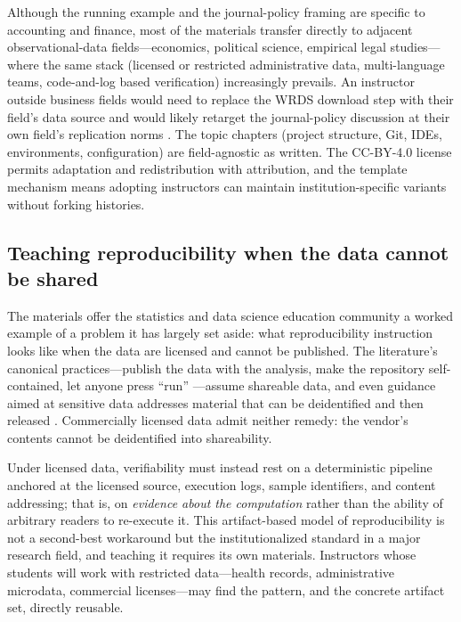 \documentclass[12pt]{article}
\begin{document}
Although the running example and the journal-policy framing are specific
to accounting and finance, most of the materials transfer directly to
adjacent observational-data fields---economics, political science,
empirical legal studies---where the same stack (licensed or restricted
administrative data, multi-language teams, code-and-log based
verification) increasingly prevails. An instructor outside business
fields would need to replace the WRDS download step with their field's
data source and would likely retarget the journal-policy discussion at
their own field's replication norms
\citep{christensen2018transparency}. The topic chapters (project
structure, Git, IDEs, environments, configuration) are field-agnostic as
written. The CC-BY-4.0 license permits adaptation and redistribution with
attribution, and the template mechanism means adopting instructors can
maintain institution-specific variants without forking histories.

\subsection{Teaching reproducibility when the data cannot be shared}

The materials offer the statistics and data science education community a
worked example of a problem it has largely set aside: what reproducibility
instruction looks like when the data are licensed and cannot be
published. The literature's canonical practices---publish the data with
the analysis, make the repository self-contained, let anyone press
``run'' \citep{peng2011reproducible, dogucu2022reproducible}---assume
shareable data, and even guidance aimed at sensitive data addresses
material that can be deidentified and then released
\citep{horton2024editorial}. Commercially licensed data admit neither
remedy: the vendor's contents cannot be deidentified into shareability.

Under licensed data, verifiability must instead rest on a deterministic
pipeline anchored at the licensed source, execution logs, sample
identifiers, and content addressing; that is, on \emph{evidence about the
computation} rather than the ability of arbitrary readers to re-execute
it. This artifact-based model of reproducibility is not a second-best
workaround but the institutionalized standard in a major research field,
and teaching it requires its own materials. Instructors whose students
will work with restricted data---health records, administrative
microdata, commercial licenses---may find the pattern, and the concrete
artifact set, directly reusable.
\end{document}
